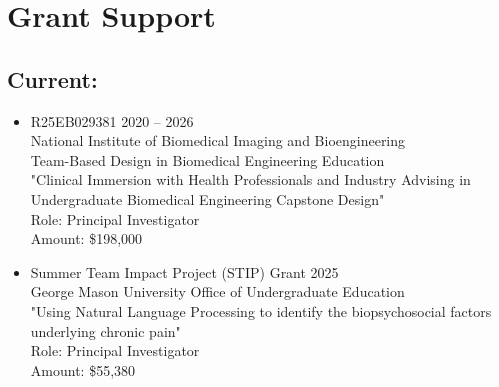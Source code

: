 \documentclass[letterpaper, 10pt]{article}
\begin{document}
\section{Grant Support}

\subsection{Current:}
\begin{itemize}
    \item[] R25EB029381  \hfill 2020 -- 2026\\
    National Institute of Biomedical Imaging and Bioengineering\\
    Team-Based Design in Biomedical Engineering Education\\
    "Clinical Immersion with Health Professionals and Industry Advising in Undergraduate Biomedical Engineering Capstone Design"\\
    Role: Principal Investigator\\
    Amount: \$198,000\\
    
    \item[] Summer Team Impact Project (STIP) Grant \hfill 2025\\
    George Mason University Office of Undergraduate Education\\
    "Using Natural Language Processing to identify the biopsychosocial factors underlying chronic pain"\\
    Role: Principal Investigator\\
    Amount: \$55,380\\
    
\end{itemize}
\end{document}
